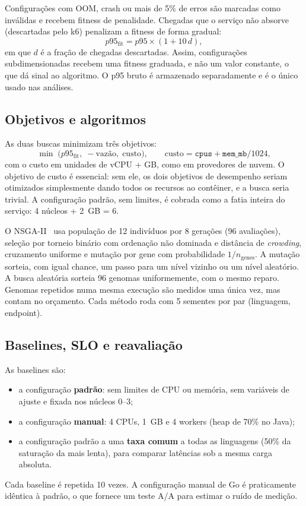 \documentclass[11pt,a4paper]{article}
\begin{document}
Configurações com OOM, crash ou mais de 5\% de erros são marcadas como inválidas e recebem fitness de penalidade.
Chegadas que o serviço não absorve (descartadas pelo k6) penalizam a fitness de forma gradual:
\begin{equation}
  p95_{\text{fit}} = p95 \times (1 + 10\,d),
\end{equation}
em que $d$ é a fração de chegadas descartadas. Assim, configurações subdimensionadas recebem uma fitness graduada,
e não um valor constante, o que dá sinal ao algoritmo. O p95 bruto é armazenado separadamente e é o único usado nas análises.

\subsection{Objetivos e algoritmos}

As duas buscas minimizam três objetivos:
\begin{equation}
  \min \; \big( p95_{\text{fit}},\; -\text{vazão},\; \text{custo} \big), \qquad \text{custo} = \texttt{cpus} + \texttt{mem\_mb}/1024,
\end{equation}
com o custo em unidades de vCPU + GB, como em provedores de nuvem. O objetivo de custo é essencial: sem ele, os dois
objetivos de desempenho seriam otimizados simplesmente dando todos os recursos ao contêiner, e a busca seria trivial.
A configuração padrão, sem limites, é cobrada como a fatia inteira do serviço: 4 núcleos + \SI{2}{GB} = 6.

O NSGA-II~\cite{deb2002} usa população de 12 indivíduos por 8 gerações (96 avaliações), seleção por torneio binário
com ordenação não dominada e distância de \emph{crowding}, cruzamento uniforme e mutação por gene com probabilidade
$1/n_{\text{genes}}$. A mutação sorteia, com igual chance, um passo para um nível vizinho ou um nível aleatório.
A busca aleatória sorteia 96 genomas uniformemente, com o mesmo reparo. Genomas repetidos numa mesma execução são
medidos uma única vez, mas contam no orçamento. Cada método roda com 5 sementes por par (linguagem, endpoint).

\subsection{Baselines, SLO e reavaliação}
\label{sec:metodologia-reavaliacao}

As baselines são:
\begin{itemize}
  \item a configuração \textbf{padrão}: sem limites de CPU ou memória, sem variáveis de ajuste e fixada nos núcleos 0--3;
  \item a configuração \textbf{manual}: 4 CPUs, \SI{1}{GB} e 4 workers (heap de 70\% no Java);
  \item a configuração padrão a uma \textbf{taxa comum} a todas as linguagens (50\% da saturação da mais lenta), para comparar latências sob a mesma carga absoluta.
\end{itemize}
Cada baseline é repetida 10 vezes. A configuração manual de Go é praticamente idêntica à padrão, o que fornece um
teste A/A para estimar o ruído de medição.
\end{document}
